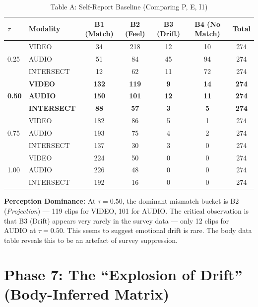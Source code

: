 \documentclass[11pt, a4paper]{report}
\begin{document}
\begin{table}[H]
    \centering
    \small
    \caption{Table A: Self-Report Baseline (Comparing P, E, I1)}
    \label{tab:self-baseline}
    \begin{tabular}{@{}llccccc@{}}
        \toprule
        \textbf{$\tau$} & \textbf{Modality} & \textbf{B1 (Match)} & \textbf{B2 (Feel)} & \textbf{B3 (Drift)} & \textbf{B4 (No Match)} & \textbf{Total} \\
        \midrule
        \multirow{3}{*}{0.25} & VIDEO & 34 & 218 & 12 & 10 & 274 \\
        & AUDIO & 51 & 84 & 45 & 94 & 274 \\
        & INTERSECT & 12 & 62 & 11 & 72 & 274 \\
        \midrule
        \multirow{3}{*}{\textbf{0.50}} & \textbf{VIDEO} & \textbf{132} & \textbf{119} & \textbf{9} & \textbf{14} & \textbf{274} \\
        & \textbf{AUDIO} & \textbf{150} & \textbf{101} & \textbf{12} & \textbf{11} & \textbf{274} \\
        & \textbf{INTERSECT} & \textbf{88} & \textbf{57} & \textbf{3} & \textbf{5} & \textbf{274} \\
        \midrule
        \multirow{3}{*}{0.75} & VIDEO & 182 & 86 & 5 & 1 & 274 \\
        & AUDIO & 193 & 75 & 4 & 2 & 274 \\
        & INTERSECT & 137 & 30 & 3 & 0 & 274 \\
        \midrule
        \multirow{3}{*}{1.00} & VIDEO & 224 & 50 & 0 & 0 & 274 \\
        & AUDIO & 226 & 48 & 0 & 0 & 274 \\
        & INTERSECT & 192 & 16 & 0 & 0 & 274 \\
        \bottomrule
    \end{tabular}
\end{table}

\textbf{Perception Dominance:} At $\tau = 0.50$, the dominant mismatch bucket is B2 (\textit{Projection}) --- 119 clips for VIDEO, 101 for AUDIO. The critical observation is that B3 (Drift) appears very rarely in the survey data --- only 12 clips for AUDIO at $\tau = 0.50$. This seems to suggest emotional drift is rare. The body data table reveals this to be an artefact of survey suppression.


\section{Phase 7: The ``Explosion of Drift'' (Body-Inferred Matrix)}
\label{sec:results-body}
\end{document}
